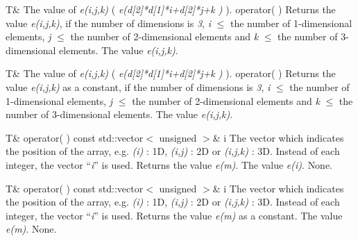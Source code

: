 \setNormalInstance
\setCorrectWidthThree{8pt}
\printMethodWithParamsSaved
{T\&}
{The value of {\em e(i,j,k)} ( {\em e(d[2]*d[1]*i+d[2]*j+k )} ).}
{operator( )}
{Returns the value {\em e(i,j,k)}, if the number of dimensions is {\em
3}, {\em i} $\le$
the number of 1-dimensional elements, {\em j} $\le$ the
number of 2-dimensional elements and {\em k} $\le$ the number of
3-dimensional elements.}
{The value {\em e(i,j,k)}.}
\setCorrectWidthThree{4pt}

\clearpage

\setConstInstance
\setCorrectWidthThree{8pt}
\printMethodWithParamsSaved
{T\&}
{The value of {\em e(i,j,k)} ( {\em e(d[2]*d[1]*i+d[2]*j+k )} ).}
{operator( )}
{Returns the value {\em e(i,j,k)} as a constant, if the number of
dimensions is {\em 3}, {\em i} $\le$
the number of 1-dimensional elements, {\em j} $\le$ the
number of 2-dimensional elements and {\em k} $\le$ the number of
3-dimensional elements.}
{The value {\em e(i,j,k)}.}
\setCorrectWidthThree{4pt}

\setNormalInstance
\printMethodWithOneParam
{T\&}
{operator( )}
{const std::vector$<$ unsigned $>$\&}
{i}
{The vector which indicates the position of the array, e.g. {\em (i)} : 1D,
{\em (i,j)} : 2D or {\em (i,j,k)} : 3D. Instead of each integer, the
vector ``{\em i}'' is used.}
{Returns the value {\em e(m)}.}
{The value {\em e(i)}.}
{None.}

\setConstInstance
\printMethodWithOneParam
{T\&}
{operator( )}
{const std::vector$<$ unsigned $>$\&}
{i}
{The vector which indicates the position of the array, e.g. {\em (i)} : 1D,
{\em (i,j)} : 2D or {\em (i,j,k)} : 3D. Instead of each integer, the
vector ``{\em i}'' is used.}
{Returns the value {\em e(m)} as a constant.}
{The value {\em e(m)}.}
{None.}

